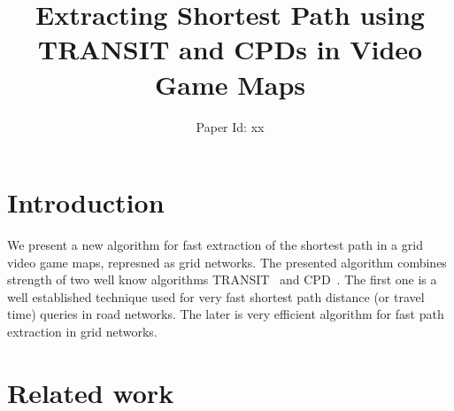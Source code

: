\documentclass[runningheads,a4paper]{llncs}
\begin{document}
\mainmatter  %

\title{Extracting Shortest Path using TRANSIT and CPDs in Video Game Maps}


%
%
\author{Paper Id: xx}



\maketitle

\section{Introduction}
We present a new algorithm for fast extraction of the shortest path in a grid video game maps, represned as grid networks.
The presented algorithm combines strength of two well know algorithms TRANSIT~\cite{bast06} and CPD~\cite{sanka05}.
The first one is a well established technique used for very fast shortest path distance (or travel time) queries in road networks.
The later is very efficient algorithm for fast path extraction in grid networks.

\section{Related work}
\end{document}
